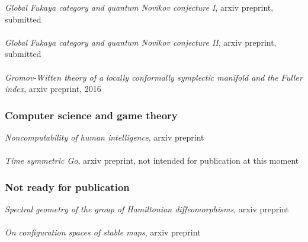 \documentclass[overlapped,line,letterpaper]{res}
\begin{document}
\begin{resume}
\emph{Global Fukaya category and quantum Novikov conjecture I},  arxiv preprint, submitted \\\\
\emph {Global Fukaya category and quantum Novikov conjecture II},  arxiv preprint, submitted \\\\
\emph {Gromov-Witten theory of a locally conformally symplectic manifold and the
Fuller index}, arxiv preprint, 2016 
\subsubsection {Computer science and game theory}
\emph {Noncomputability of human intelligence}, arxiv preprint \\\\
\emph {Time symmetric Go}, arxiv preprint, not intended for publication at this moment
\subsubsection {Not ready for publication} 
\emph{Spectral geometry of the group of Hamiltonian diffeomorphisms},  arxiv preprint \\\\
 {\em {On configuration spaces of stable maps}}, arxiv preprint \\\\ 

\end{resume}
\end{document}
